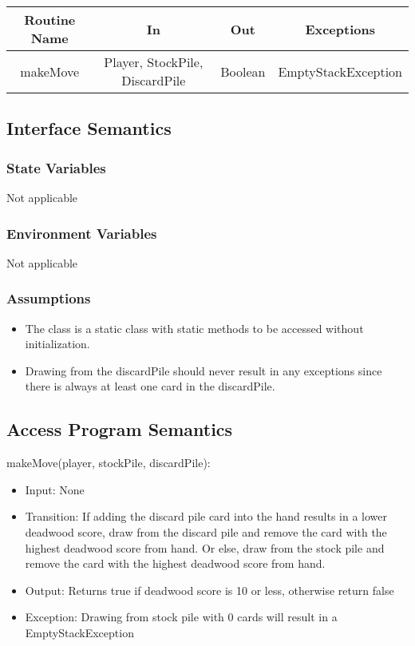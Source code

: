 \documentclass[12pt, titlepage]{article}
\begin{document}
\begin{tabular}[pos]{| c | c | c | c |}
    \hline
    \textbf{Routine Name} & \textbf{In} & \textbf{Out} & \textbf{Exceptions}\\
    \hline
    makeMove & Player, StockPile, DiscardPile & Boolean & EmptyStackException\\
    \hline
\end{tabular}

\subsection{Interface Semantics}
\subsubsection{State Variables}
Not applicable

\subsubsection{Environment Variables}
Not applicable

\subsubsection{Assumptions}
\begin{itemize}
    \item The class is a static class with static methods to be accessed without initialization.
    \item Drawing from the discardPile should never result in any exceptions since there is always at least one card in the discardPile.
\end{itemize}

\subsection{Access Program Semantics}
\noindent makeMove(player, stockPile, discardPile):
\begin{itemize}
    \item Input: None 
    \item Transition: If adding the discard pile card into the hand results in a lower deadwood score, draw from the discard pile and remove the card with the highest deadwood score from hand. Or else, draw from the stock pile and remove the card with the highest deadwood score from hand.
    \item Output: Returns true if deadwood score is 10 or less, otherwise return false
    \item Exception: Drawing from stock pile with 0 cards will result in a EmptyStackException
\end{itemize}
\end{document}
